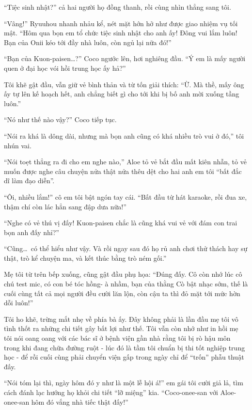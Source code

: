 \documentclass[../main.tex]{subfiles}
\begin{document}
``Tiệc sinh nhật?'' cả hai người họ đồng thanh, rồi cùng nhìn thẳng sang tôi.

``Vâng!'' Ryuuhou nhanh nhảu kể, nét mặt hớn hở như được giao nhiệm vụ tối mật. ``Hôm qua bọn em tổ chức tiệc sinh nhật cho anh ấy! Đông vui lắm luôn! Bạn của Onii kéo tới đầy nhà luôn, còn ngủ lại nữa đó!''

``Bạn của Kuon-paisen\dots?'' Coco ngước lên, hơi nghiêng đầu. ``Ý em là mấy người quen ở đại học vói hồi trung học ấy hả?''

Tôi khẽ gật đầu, vẫn giữ vẻ bình thản và từ tốn giải thích: ``Ừ. Mà thề, mấy ông ấy tự lên kế hoạch hết, anh chẳng biết gì cho tới khi bị bố anh mời xuống tầng luôn.''

``Nó như thế nào vậy?'' Coco tiếp tục.

``Nói ra khá là dông dài, nhưng mà bọn anh cũng có khá nhiều trò vui ở đó,'' tôi nhún vai.

``Nói toẹt thẳng ra đi cho em nghe nào,'' Aloe tỏ vẻ bắt đầu mất kiên nhẫn, tỏ vẻ muốn được nghe câu chuyện nửa thật nửa thêu dệt cho hai anh em tôi ``bất đắc dĩ làm đạo diễn''.

``Ôi, nhiều lắm!'' cô em tôi bật ngón tay cái. ``Bất đầu từ hát karaoke, rồi đua xe, thậm chí còn lác hẳn sang đập dưa nữa!''

``Nghe có vẻ thú vị đấy! Kuon-paisen chắc là cũng khá vui vẻ với đám con trai bọn anh đấy nhỉ?''

``Cũng\dots\ có thể hiểu như vậy. Và rồi ngay sau đó họ rủ anh chơi thử thách hay sự thật, trò kể chuyện ma, và kết thúc bằng trò ném gối.''

Mẹ tôi từ trên bếp xuống, cũng gật đầu phụ họa: ``Đúng đấy. Cô còn nhớ lúc cô chú test mic, có con bé tóc hồng- à nhầm, bạn của thằng Cò bật nhạc sớm, thế là cuối cùng tất cả mọi người đều cười lăn lộn, còn cậu ta thì đỏ mặt tới mức hờn dỗi luôn!''

Tôi ho khẽ, trừng mắt nhẹ về phía bà ấy. Đây không phải là lần đầu mẹ tôi vô tình thốt ra những chi tiết gây bất lợi như thế. Tôi vẫn còn nhớ như in hồi mẹ tôi nói oang oang với các bác sĩ ở bệnh viện gần nhà rằng tôi bị rò hậu môn trong khi đang chữa đường ruột - lúc đó là tầm tôi chuẩn bị thi tốt nghiệp trung học - để rồi cuối cùng phải chuyển viện gấp trong ngày chỉ để ``trốn'' phẫu thuật đấy.

``Nói tóm lại thì, ngày hôm đó y như là một lễ hội á!'' em gái tôi cười giả lả, tìm cách đánh lạc hướng họ khỏi chi tiết ``lỡ miệng'' kia. ``Coco-onee-san với Aloe-onee-san hôm đó vắng nhà tiếc thật đấy!''
\end{document}
